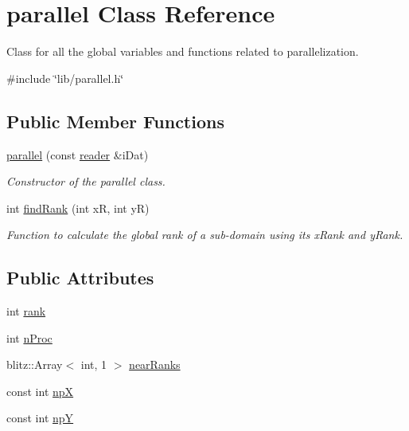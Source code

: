 \hypertarget{classparallel}{}\section{parallel Class Reference}
\label{classparallel}


Class for all the global variables and functions related to parallelization.  




{\ttfamily \#include \char`\"{}lib/parallel.\+h\char`\"{}}

\subsection*{Public Member Functions}
\begin{DoxyCompactItemize}
\item 
\hyperlink{classparallel_a84642f9536a8023f627c33ef903816a5}{parallel} (const \hyperlink{classreader}{reader} \&i\+Dat)
\begin{DoxyCompactList}\small\item\em Constructor of the parallel class. \end{DoxyCompactList}\item 
int \hyperlink{classparallel_a8152677d080d507c3a553d7f2af57880}{find\+Rank} (int xR, int yR)
\begin{DoxyCompactList}\small\item\em Function to calculate the global rank of a sub-\/domain using its x\+Rank and y\+Rank. \end{DoxyCompactList}\end{DoxyCompactItemize}
\subsection*{Public Attributes}
\begin{DoxyCompactItemize}
\item 
int \hyperlink{classparallel_a7e7e97e491ded7bf23632bf9e01aa5a2}{rank}
\item 
int \hyperlink{classparallel_afa82c4aacafed73ae34ac5f02bc865fa}{n\+Proc}
\item 
blitz\+::\+Array$<$ int, 1 $>$ \hyperlink{classparallel_a7b13d9a40183bca2c103caf50bb16a51}{near\+Ranks}
\end{DoxyCompactItemize}
{\bf }\par
\begin{DoxyCompactItemize}
\item 
const int \hyperlink{classparallel_a7d0143756e8589f09de11b175ea0f167}{npX}
\item 
const int \hyperlink{classparallel_aa99115d1a61730e862d690f6ccc4e79e}{npY}
\end{DoxyCompactItemize}

